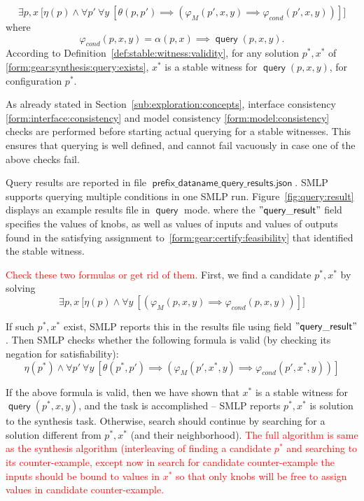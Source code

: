 \documentclass[a4paper,parskip=half]{article} %
\newcommand*\eqdef=
\newcommand*\query{\operatorname{\mathsf{query}}}
\newcommand*\suffix[1]{\operatorname{\mathsf{#1}}} %
\newcommand*\mode[1]{\operatorname{\mathsf{#1}}} %
\newcommand*\speckey[1]{\operatorname{\mathsf{"{#1}"}}} %
\newcommand\todozk[1]{\textcolor{red}{#1}}
\newcommand*\ZK{\todozk}
\begin{document}
\begin{equation}\label{form:gear:synthesis:query:exists}
    \exists p, x ~\big[ \eta(p) \wedge
    \forall p'~
    \forall y~[
    \theta(p,p') \implies (\varphi_M(p',x,y)  \implies  \varphi_{\mathit{cond}}(p',x,y))
    ]\big]
\end{equation} 
where \[\varphi_{\mathit{cond}}(p,x,y) \eqdef \alpha(p,x) \implies \query(p,x,y).\]
According to Definition~\ref{def:stable:witness:validity}, for any solution $p^*,x^*$ of \cref{form:gear:synthesis:query:exists},
$x^*$ is a stable witness for  $\query(p, x, y)$, for configuration $p^*$.

As already stated in Section~\ref{sub:exploration:concepts}, interface consistency \cref{form:interface:consistency} and
model consistency \cref{form:model:consistency} checks are performed before starting actual querying for a stable witnesses.
This ensures that querying is well defined, and cannot fail  vacuously in case one of the above checks fail.


Query results are reported in file $\suffix{prefix\_dataname\_query\_results.json}$.
SMLP supports querying multiple conditions in one SMLP run. 
Figure~\ref{fig:query:result} displays an example results file in $\mode{query}$ mode.
where the  $\speckey{query\_result}$ field 
specifies the values of knobs, as well as values of inputs and values of outputs
found in the satisfying assignment to~\cref{form:gear:certify:feasibility} that identified the stable witness.


\ZK{Check these two formulas or get rid of them.} First, we find a candidate $p^*, x^*$ by solving
\begin{equation}\label{form:gear:synthesis:query}
    \exists p, x ~\big[ \eta(p) \wedge
    \forall y~[
    (\varphi_M(p,x,y)  \implies  \varphi_{\mathit{cond}}(p,x,y))
    ]\big]
\end{equation} 

If such $p^*, x^*$  exist, SMLP reports this in the results file using field  $\speckey{query\_result}$.
Then SMLP checks whether the following formula is valid (by checking its negation for satisfiability): 
\begin{equation}\label{form:gear:synthesis:query}
    \eta(p^*) \wedge
    \forall p'~
    \forall y~[
    \theta(p^*,p') \implies (\varphi_M(p',x^*,y)  \implies  \varphi_{\mathit{cond}}(p',x^*,y))
    ]
\end{equation} 

If the above formula is valid, then we have shown that $x^*$ is a stable witness for  $\query(p^*, x, y)$, 
and the task is accomplished -- SMLP reports $p^*, x^*$ is solution to the synthesis task. Otherwise,
search should continue by searching for a solution different from $p^*, x^*$ (and their neighborhood).
\ZK{The full algorithm is same as the synthesis algorithm (interleaving of finding a candidate $p^*$
and searching to its counter-example, except now in search for candidate counter-example the inputs should
be bound to values in $x^*$ so that only knobs will be free to assign values in candidate counter-example.}
\end{document}
